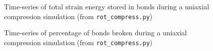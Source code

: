 \begin{figure}
\begin{center}
\end{center}
\caption{Time-series of total strain energy stored in bonds during a uniaxial compression simulation (from \texttt{rot\_compress.py})} \label{fig:UCS_PE}
\end{figure}

\begin{figure}
\begin{center}
\end{center}
\caption{Time-series of percentage of bonds broken during a uniaxial compression simulation (from \texttt{rot\_compress.py})} \label{fig:UCS_nbroke}
\end{figure}


